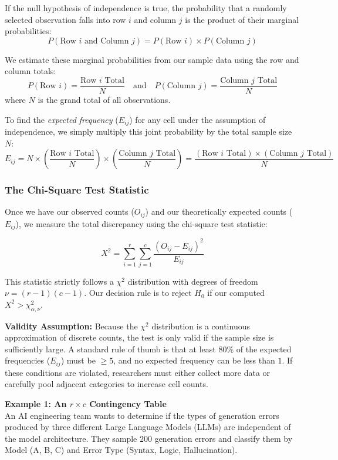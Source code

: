 \documentclass{article}
\begin{document}
If the null hypothesis of independence is true, the probability that a randomly selected observation falls into row $i$ and column $j$ is the product of their marginal probabilities:
$$ P(\text{Row } i \text{ and Column } j) = P(\text{Row } i) \times P(\text{Column } j) $$

We estimate these marginal probabilities from our sample data using the row and column totals:
$$ P(\text{Row } i) = \frac{\text{Row } i \text{ Total}}{N} \quad \text{and} \quad P(\text{Column } j) = \frac{\text{Column } j \text{ Total}}{N} $$
where $N$ is the grand total of all observations. 

To find the \emph{expected frequency} ($E_{ij}$) for any cell under the assumption of independence, we simply multiply this joint probability by the total sample size $N$:
$$ E_{ij} = N \times \left( \frac{\text{Row } i \text{ Total}}{N} \right) \times \left( \frac{\text{Column } j \text{ Total}}{N} \right) = \frac{(\text{Row } i \text{ Total}) \times (\text{Column } j \text{ Total})}{N} $$

\subsubsection{The Chi-Square Test Statistic}

Once we have our observed counts ($O_{ij}$) and our theoretically expected counts ($E_{ij}$), we measure the total discrepancy using the chi-square test statistic:

$$ X^2 = \sum_{i=1}^{r} \sum_{j=1}^{c} \frac{(O_{ij} - E_{ij})^2}{E_{ij}} $$

This statistic strictly follows a $\chi^2$ distribution with degrees of freedom $\nu = (r-1)(c-1)$. Our decision rule is to reject $H_0$ if our computed $X^2 > \chi^2_{\alpha, \nu}$.

\textbf{Validity Assumption:} Because the $\chi^2$ distribution is a continuous approximation of discrete counts, the test is only valid if the sample size is sufficiently large. A standard rule of thumb is that at least 80\% of the expected frequencies ($E_{ij}$) must be $\geq 5$, and no expected frequency can be less than $1$. If these conditions are violated, researchers must either collect more data or carefully pool adjacent categories to increase cell counts.

\vspace{1em}
\textbf{Example 1: An $r \times c$ Contingency Table} \\
An AI engineering team wants to determine if the types of generation errors produced by three different Large Language Models (LLMs) are independent of the model architecture. They sample $200$ generation errors and classify them by Model (A, B, C) and Error Type (Syntax, Logic, Hallucination). 
\end{document}
